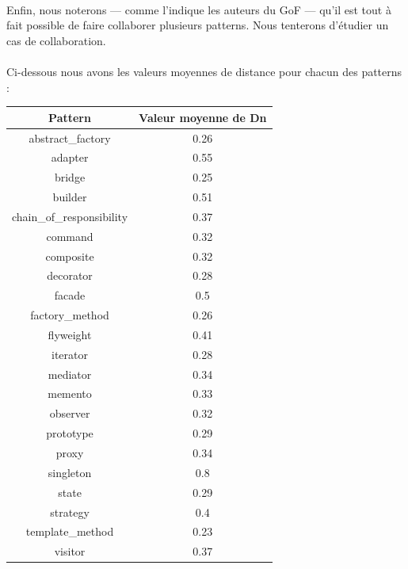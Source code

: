 \documentclass{scrartcl}
\begin{document}
    \paragraph{}Enfin, nous noterons --- comme l'indique les auteurs du GoF --- qu'il est tout à fait possible de faire collaborer plusieurs patterns. Nous tenterons d'étudier un cas de collaboration.
    
    \paragraph{}Ci-dessous nous avons les valeurs moyennes de distance pour chacun des patterns :
    \begin{center}
        \begin{tabular}{|c|c|}
            \hline
            Pattern & Valeur moyenne de Dn \\ \hline
            abstract\_factory & 0.26 \\ \hline
            adapter & 0.55 \\ \hline
            bridge & 0.25 \\ \hline
            builder & 0.51 \\ \hline
            chain\_of\_responsibility & 0.37 \\ \hline
            command & 0.32 \\ \hline
            composite & 0.32 \\ \hline
            decorator & 0.28 \\ \hline
            facade & 0.5  \\ \hline
            factory\_method & 0.26 \\ \hline
            flyweight & 0.41 \\ \hline
            iterator & 0.28 \\ \hline
            mediator & 0.34 \\ \hline
            memento & 0.33 \\ \hline
            observer & 0.32 \\ \hline
            prototype & 0.29 \\ \hline
            proxy & 0.34 \\ \hline
            singleton & 0.8  \\ \hline
            state & 0.29 \\ \hline
            strategy & 0.4  \\ \hline
            template\_method & 0.23 \\ \hline
            visitor & 0.37 \\ \hline
        \end{tabular}
    \end{center}
    
\end{document}
